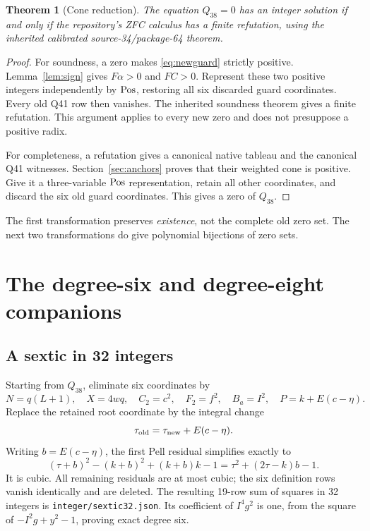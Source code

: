 \documentclass[11pt]{article}
\newtheorem{theorem}{Theorem}[section]
\theoremstyle{remark}\newtheorem{remark}[theorem]{Remark}
\begin{document}
\begin{theorem}[Cone reduction]
The equation $Q_{38}=0$ has an integer solution if and only if the repository's ZFC calculus has a finite refutation, using the inherited calibrated source-34/package-64 theorem.
\end{theorem}
\begin{proof}
For soundness, a zero makes \eqref{eq:newguard} strictly positive. Lemma~\ref{lem:sign} gives $F\alpha>0$ and $FC>0$. Represent these two positive integers independently by $\operatorname{Pos}$, restoring all six discarded guard coordinates. Every old Q41 row then vanishes. The inherited soundness theorem gives a finite refutation. This argument applies to every new zero and does not presuppose a positive radix.

For completeness, a refutation gives a canonical native tableau and the canonical Q41 witnesses. Section~\ref{sec:anchors} proves that their weighted cone is positive. Give it a three-variable $\operatorname{Pos}$ representation, retain all other coordinates, and discard the six old guard coordinates. This gives a zero of $Q_{38}$.
\end{proof}

The first transformation preserves \emph{existence}, not the complete old zero set. The next two transformations do give polynomial bijections of zero sets.

\section{The degree-six and degree-eight companions}

\subsection{A sextic in 32 integers}

Starting from $Q_{38}$, eliminate six coordinates by
\[
 N=q(L+1),\quad X=4wq,\quad C_2=c^2,\quad F_2=f^2,
 \quad B_a=I^2,\quad P=k+E(c-\eta).
\]
Replace the retained root coordinate by the integral change
\[
 \tau_{\rm old}=\tau_{\rm new}+E(c-\eta).
\]
Writing $b=E(c-\eta)$, the first Pell residual simplifies exactly to
\[
 (\tau+b)^2-(k+b)^2+(k+b)k-1
 =\tau^2+(2\tau-k)b-1.
\]
It is cubic. All remaining residuals are at most cubic; the six definition rows vanish identically and are deleted. The resulting 19-row sum of squares in 32 integers is \texttt{integer/sextic32.json}. Its coefficient of $I^4g^2$ is one, from the square of $-I^2g+y^2-1$, proving exact degree six.
\end{document}
